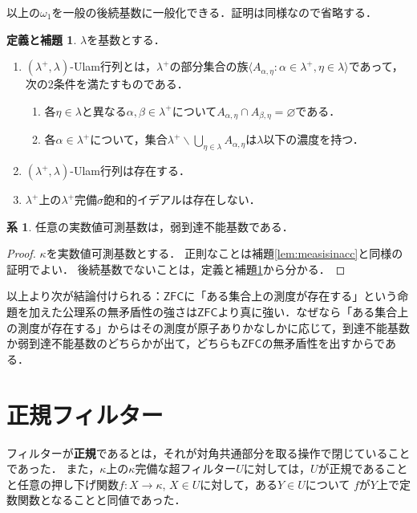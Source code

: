\documentclass[uplatex]{jsarticle}
\newcommand{\ZFC}{\mathsf{ZFC}}
\newcommand{\seq}[1]{{\langle#1\rangle}}
\renewcommand\emptyset{\varnothing}
\renewcommand{\setminus}{\smallsetminus}
\theoremstyle{definition}
\newtheorem{cor}[thm]{系}
\newtheorem{defiandlem}[thm]{定義と補題}
\begin{document}
	以上の$\omega_1$を一般の後続基数に一般化できる．証明は同様なので省略する．
	
	\begin{defiandlem}\label{dl:lambdaplusulam}
		$\lambda$を基数とする．
		\begin{enumerate}
			\item $(\lambda^+, \lambda)$-Ulam行列とは，$\lambda^+$の部分集合の族$\seq{ A_{\alpha, \eta} : \alpha \in \lambda^+, \eta \in \lambda }$であって，次の2条件を満たすものである．
			\begin{enumerate}
				\item 各$\eta \in \lambda$と異なる$\alpha, \beta \in \lambda^+$について$A_{\alpha,\eta} \cap A_{\beta,\eta} = \emptyset$である．
				\item 各$\alpha \in \lambda^+$について，集合$\lambda^+ \setminus \bigcup_{\eta \in \lambda} A_{\alpha,\eta}$は$\lambda$以下の濃度を持つ．
			\end{enumerate}
			\item $(\lambda^+, \lambda)$-Ulam行列は存在する．
			\item $\lambda^+$上の$\lambda^+$完備$\sigma$飽和的イデアルは存在しない．
		\end{enumerate}
	\end{defiandlem}
	
	\begin{cor}
		任意の実数値可測基数は，弱到達不能基数である．
	\end{cor}
	\begin{proof}
		$\kappa$を実数値可測基数とする．
		正則なことは補題\ref{lem:measisinacc}と同様の証明でよい．
		後続基数でないことは，定義と補題\ref{dl:lambdaplusulam}から分かる．
	\end{proof}
	
	以上より次が結論付けられる：$\ZFC$に「ある集合上の測度が存在する」という命題を加えた公理系の無矛盾性の強さは$\ZFC$より真に強い．なぜなら「ある集合上の測度が存在する」からはその測度が原子ありかなしかに応じて，到達不能基数か弱到達不能基数のどちらかが出て，どちらも$\ZFC$の無矛盾性を出すからである．
	
	\section{正規フィルター}
	
	フィルターが\textbf{正規}であるとは，それが対角共通部分を取る操作で閉じていることであった．
	また，$\kappa$上の$\kappa$完備な超フィルター$U$に対しては，$U$が正規であることと任意の押し下げ関数$f \colon X \to \kappa$, $X \in U$に対して，ある$Y \in U$について $f$が$Y$上で定数関数となることと同値であった．
	
\end{document}

